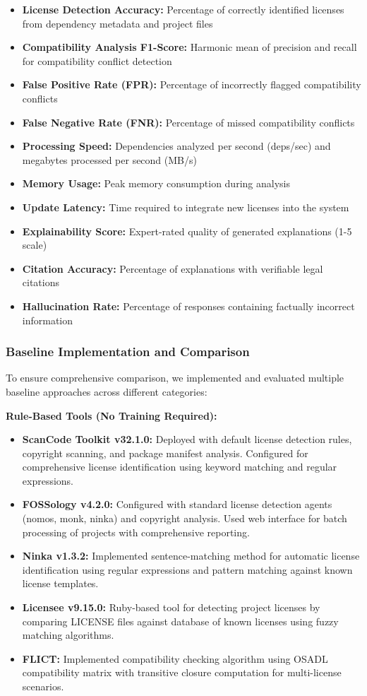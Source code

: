 \begin{itemize}
    \item \textbf{License Detection Accuracy:} Percentage of correctly identified licenses from dependency metadata and project files
    \item \textbf{Compatibility Analysis F1-Score:} Harmonic mean of precision and recall for compatibility conflict detection
    \item \textbf{False Positive Rate (FPR):} Percentage of incorrectly flagged compatibility conflicts
    \item \textbf{False Negative Rate (FNR):} Percentage of missed compatibility conflicts
    \item \textbf{Processing Speed:} Dependencies analyzed per second (deps/sec) and megabytes processed per second (MB/s)
    \item \textbf{Memory Usage:} Peak memory consumption during analysis
    \item \textbf{Update Latency:} Time required to integrate new licenses into the system
    \item \textbf{Explainability Score:} Expert-rated quality of generated explanations (1-5 scale)
    \item \textbf{Citation Accuracy:} Percentage of explanations with verifiable legal citations
    \item \textbf{Hallucination Rate:} Percentage of responses containing factually incorrect information
\end{itemize}

\subsubsection{Baseline Implementation and Comparison}
To ensure comprehensive comparison, we implemented and evaluated multiple baseline approaches across different categories:

\textbf{Rule-Based Tools (No Training Required):}
\begin{itemize}
    \item \textbf{ScanCode Toolkit v32.1.0:} Deployed with default license detection rules, copyright scanning, and package manifest analysis. Configured for comprehensive license identification using keyword matching and regular expressions.
    \item \textbf{FOSSology v4.2.0:} Configured with standard license detection agents (nomos, monk, ninka) and copyright analysis. Used web interface for batch processing of projects with comprehensive reporting.
    \item \textbf{Ninka v1.3.2:} Implemented sentence-matching method for automatic license identification using regular expressions and pattern matching against known license templates.
    \item \textbf{Licensee v9.15.0:} Ruby-based tool for detecting project licenses by comparing LICENSE files against database of known licenses using fuzzy matching algorithms.
    \item \textbf{FLICT:} Implemented compatibility checking algorithm using OSADL compatibility matrix with transitive closure computation for multi-license scenarios.
\end{itemize}


